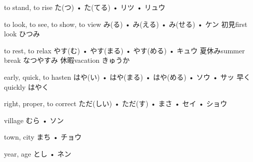 



\setcounter{cardnum}{65}

		{to stand, to rise}
		{た(つ) • た(てる) • リツ • リュウ}
		{}{}
		{}{}
		{}{}
		{}{}
		{}{}

		{to look, to see, to show, to view}
		{み(る) • み(える) • み(せる) • ケン}
		{初見}{first look ひつみ}
		{}{}
		{}{}
		{}{}
		{}{}

		{to rest, to relax}
		{やす(む) • やす(まる) • やす(める) • キュウ}
		{夏休み}{summer break なつやすみ}
		{休暇}{vacation きゅうか}
		{}{}
		{}{}
		{}{}

		{early, quick, to hasten}
		{はや(い) • はや(まる) • はや(める) • ソウ • サッ}
		{早く}{quickly はやく}
		{}{}
		{}{}
		{}{}
		{}{}

		{right, proper, to correct}
		{ただ(しい) • ただ(す) • まさ • セイ • ショウ}
		{}{}
		{}{}
		{}{}
		{}{}
		{}{}

		{village}
		{むら • ソン}
		{}{}
		{}{}
		{}{}
		{}{}
		{}{}

		{town, city}
		{まち • チョウ}
		{}{}
		{}{}
		{}{}
		{}{}
		{}{}

		{year, age}
		{とし • ネン}
		{}{}
		{}{}
		{}{}
		{}{}
		{}{}

